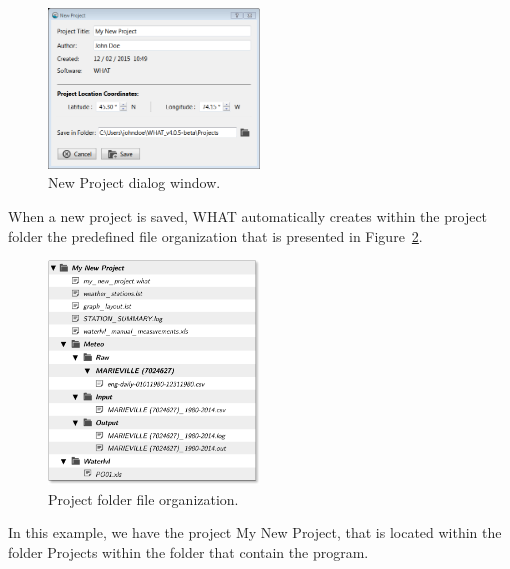 \documentclass[12pt, letterpaper, fleqn]{report}
\begin{document}

\begin{figure}[h!]
\centering
\includegraphics[width=0.5\textwidth]{WHAT_Screenshot_newproject}
\caption[New Project dialog window.]{New Project dialog window.}
\label{fig:new_proj_win}
\end{figure}

When a new project is saved, WHAT automatically creates within the project folder the predefined file organization that is presented in Figure~\ref{fig:proFolder_organization}.

\begin{figure}[h!]
\centering
\includegraphics[width=0.5\textwidth]{file_and_folder_architecture}
\caption[Project folder file organization.]{Project folder file organization.}
\label{fig:proFolder_organization}
\end{figure}

In this example, we have the project My New Project, that is located within the folder Projects within the folder that contain the program.
\end{document}
